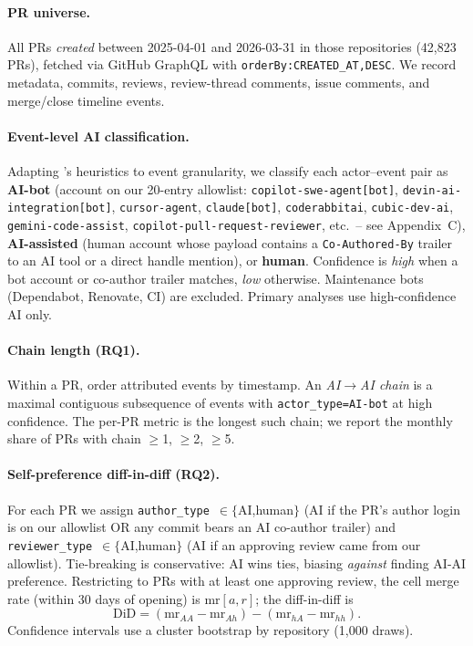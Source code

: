 \documentclass{article}
\begin{document}
\paragraph{PR universe.} All PRs \emph{created} between 2025-04-01 and 2026-03-31 in those repositories (42,823{} PRs), fetched via GitHub GraphQL with \texttt{orderBy:{CREATED\_AT,DESC}}. We record metadata, commits, reviews, review-thread comments, issue comments, and merge/close timeline events.

\paragraph{Event-level AI classification.} Adapting \citet{ghaleb2026fingerprinting}'s heuristics to event granularity, we classify each actor--event pair as \textbf{AI-bot} (account on our 20-entry allowlist: \texttt{copilot-swe-agent[bot]}, \texttt{devin-ai-integration[bot]}, \texttt{cursor-agent}, \texttt{claude[bot]}, \texttt{coderabbitai}, \texttt{cubic-dev-ai}, \texttt{gemini-code-assist}, \texttt{copilot-pull-request-reviewer}, etc.\ -- see Appendix~C), \textbf{AI-assisted} (human account whose payload contains a \texttt{Co-Authored-By} trailer to an AI tool or a direct handle mention), or \textbf{human}. Confidence is \emph{high} when a bot account or co-author trailer matches, \emph{low} otherwise. Maintenance bots (Dependabot, Renovate, CI) are excluded. Primary analyses use high-confidence AI only.

\paragraph{Chain length (RQ1).} Within a PR, order attributed events by timestamp. An \emph{AI$\to$AI chain} is a maximal contiguous subsequence of events with \texttt{actor\_type=AI-bot} at high confidence. The per-PR metric is the longest such chain; we report the monthly share of PRs with chain $\geq$1, $\geq$2, $\geq$5.

\paragraph{Self-preference diff-in-diff (RQ2).} For each PR we assign \texttt{author\_type}~$\in\{$AI,human$\}$ (AI if the PR's author login is on our allowlist OR any commit bears an AI co-author trailer) and \texttt{reviewer\_type}~$\in\{$AI,human$\}$ (AI if an approving review came from our allowlist). Tie-breaking is conservative: AI wins ties, biasing \emph{against} finding AI-AI preference. Restricting to PRs with at least one approving review, the cell merge rate (within 30 days of opening) is $\mathrm{mr}[a,r]$; the diff-in-diff is
\[
    \mathrm{DiD} = (\mathrm{mr}_{AA} - \mathrm{mr}_{Ah}) - (\mathrm{mr}_{hA} - \mathrm{mr}_{hh}).
\]
Confidence intervals use a cluster bootstrap by repository (1{,}000 draws).
\end{document}
